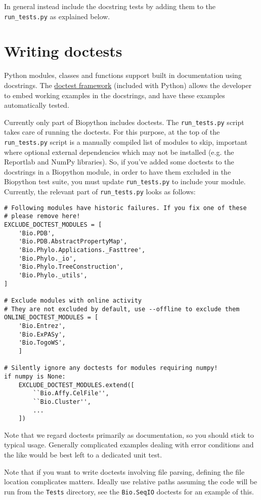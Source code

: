 In general instead include the docstring tests by adding them to the
\verb|run_tests.py| as explained below.

\section{Writing doctests}
\label{section:doctest}

Python modules, classes and functions support built in documentation using
docstrings.  The \href{https://docs.python.org/3/library/doctest.html}{doctest
framework} (included with Python) allows the developer to embed working
examples in the docstrings, and have these examples automatically tested.

Currently only part of Biopython includes doctests. The \verb|run_tests.py|
script takes care of running the doctests. For this purpose, at the top of
the \verb|run_tests.py| script is a manually compiled list of modules to
skip, important where optional external dependencies which may
not be installed (e.g. the Reportlab and NumPy libraries).  So, if you've
added some doctests to the docstrings in a Biopython module, in order to
have them excluded in the Biopython test suite, you must update
\verb|run_tests.py| to include your module. Currently, the relevant part
of \verb|run_tests.py| looks as follows:

\begin{verbatim}
# Following modules have historic failures. If you fix one of these
# please remove here!
EXCLUDE_DOCTEST_MODULES = [
    'Bio.PDB',
    'Bio.PDB.AbstractPropertyMap',
    'Bio.Phylo.Applications._Fasttree',
    'Bio.Phylo._io',
    'Bio.Phylo.TreeConstruction',
    'Bio.Phylo._utils',
]

# Exclude modules with online activity
# They are not excluded by default, use --offline to exclude them
ONLINE_DOCTEST_MODULES = [
    'Bio.Entrez',
    'Bio.ExPASy',
    'Bio.TogoWS',
    ]

# Silently ignore any doctests for modules requiring numpy!
if numpy is None:
    EXCLUDE_DOCTEST_MODULES.extend([
        ``Bio.Affy.CelFile'',
        ``Bio.Cluster'',
        ...
    ])
\end{verbatim}

Note that we regard doctests primarily as documentation, so you should
stick to typical usage. Generally complicated examples dealing with error
conditions and the like would be best left to a dedicated unit test.

Note that if you want to write doctests involving file parsing, defining
the file location complicates matters.  Ideally use relative paths assuming
the code will be run from the \verb|Tests| directory, see the
\verb|Bio.SeqIO| doctests for an example of this.

